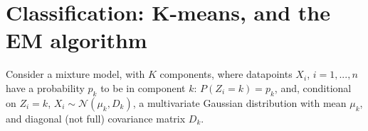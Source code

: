 \documentclass[a4paper, 11pt]{article}
\begin{document}

\maketitle

\section{Classification: K-means, and the EM algorithm}


Consider a mixture model, with $K$ components, where datapoints $X_i$, $i = 1, . . . , n$ have a probability $p_k$ to be in component $k$: $P(Z_i = k) = p_k$, and, conditional on $Z_i = k$, $X_i \sim \mathcal{N}(\mu_k,D_k)$, a multivariate Gaussian distribution with mean $\mu_k$, and diagonal (not full) covariance matrix $D_k$.
\end{document}
